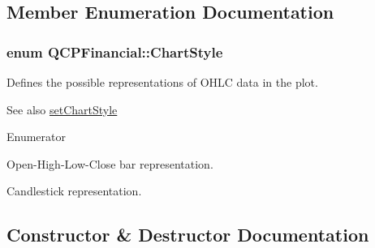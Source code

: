 \subsection{Member Enumeration Documentation}
\subsubsection[{\texorpdfstring{Chart\+Style}{ChartStyle}}]{\setlength{\rightskip}{0pt plus 5cm}enum {\bf Q\+C\+P\+Financial\+::\+Chart\+Style}}\hypertarget{classQCPFinancial_a0f800e21ee98d646dfc6f8f89d10ebfb}{}\label{classQCPFinancial_a0f800e21ee98d646dfc6f8f89d10ebfb}
Defines the possible representations of O\+H\+LC data in the plot.

\begin{DoxySeeAlso}{See also}
\hyperlink{classQCPFinancial_a5a59175d36279d71596e64d7bb65596f}{set\+Chart\+Style} 
\end{DoxySeeAlso}
\begin{Desc}
\item[Enumerator]\par
\begin{description}
\item[{\em 
cs\+Ohlc\hypertarget{classQCPFinancial_a0f800e21ee98d646dfc6f8f89d10ebfba3a516016c9298d3e95dd82aa203c4390}{}\label{classQCPFinancial_a0f800e21ee98d646dfc6f8f89d10ebfba3a516016c9298d3e95dd82aa203c4390}
}]Open-\/\+High-\/\+Low-\/\+Close bar representation. \item[{\em 
cs\+Candlestick\hypertarget{classQCPFinancial_a0f800e21ee98d646dfc6f8f89d10ebfbac803cbd39f26e3f206bcc7028679e62f}{}\label{classQCPFinancial_a0f800e21ee98d646dfc6f8f89d10ebfbac803cbd39f26e3f206bcc7028679e62f}
}]Candlestick representation. \end{description}
\end{Desc}


\subsection{Constructor \& Destructor Documentation}
